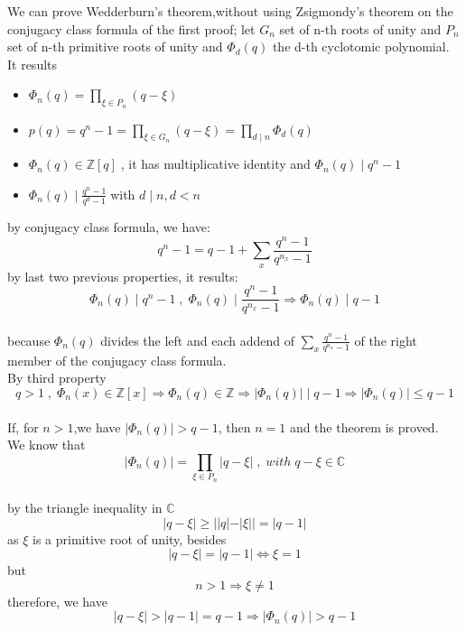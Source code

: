 \documentclass[12pt]{article}
\newcommand {\cnums}{\mathbb{C}}
\newcommand {\znums}{\mathbb{Z}}
\begin{document}
We can prove Wedderburn's theorem,without using Zsigmondy's theorem on the conjugacy class formula of the first proof;
let $G_n$ set of n-th roots of unity and $P_n$ set of n-th primitive
roots of unity and $\Phi_d(q)$ the d-th cyclotomic polynomial.\\
It results
\begin{itemize}
    \item $ \Phi_n(q)=\prod_{\xi \in P_n}(q- \xi)$
    \item $ p(q)=q^n-1=\prod _{\xi \in G_n}
 (q- \xi)=\prod_{d\mid n}\Phi_d(q) $
    \item $ \Phi_n(q)\in \znums [q] \;$, it has multiplicative identity and $\Phi_n(q)\mid q^n-1$
    \item $ \Phi_n(q) \mid \frac{q^n-1 }{q^d-1} \;$with $ d \mid n, d<n$
\end{itemize}
by conjugacy class formula, we have:
$$q^n-1=q-1+\sum_x \frac{q^n-1}{q^{n_x}-1} $$
by last two previous properties, it results:
$$ \Phi_n(q) \mid q^n-1 \;,\; \Phi_n(q) \mid \frac{q^n-1}{q^{n_x}-1}
\Rightarrow \Phi_n(q) \mid q-1$$
\\because $\Phi_n(q)$
divides the left and each addend of $ \sum_x \frac{q^n-1}{q^{n_x}-1} $  
of the right member of the conjugacy class formula.
\\By third property
$$q>1 \;,\; \Phi_n(x)\in \znums[x]
\Rightarrow \Phi_n(q)\in \znums \Rightarrow |\Phi_n(q)| \mid q-1
\Rightarrow |\Phi_n(q)|\leqslant q-1 $$
\\If, for $n>1$,we have $|\Phi_n(q)|>q-1 $, then $n=1$ and the theorem is proved.
\\We know that
\\ $$ |\Phi_n(q)|=\prod_{\xi \in P_n} |q - \xi|\;,\;with\; q- \xi\in \cnums $$
\\by the triangle inequality in $\cnums$
$$ |q-\xi|\geqslant||q|-|\xi||=|q-1|$$ as $\xi$ is a primitive root of unity,
 besides $$|q-\xi|=|q-1| \Leftrightarrow \xi=1$$
but $$n>1 \Rightarrow \xi \neq 1$$ therefore, we have
$$|q-\xi|>|q-1|=q-1 \Rightarrow |\Phi_n(q)|>q-1$$
\end{document}

